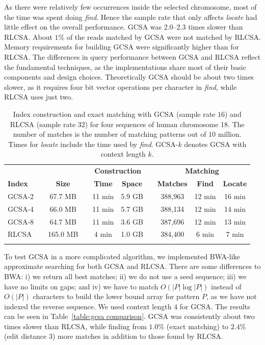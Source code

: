 As there were relatively few occurrences inside the selected chromosome, most of the time was spent doing \emph{find}. Hence the sample rate that only affects \emph{locate} had little effect on the overall performance. GCSA was 2.0\nobreakdash--2.3 times slower than RLCSA. About $1\%$ of the reads matched by GCSA were not matched by RLCSA. Memory requirements for building GCSA were significantly higher than for RLCSA. The differences in query performance between GCSA and RLCSA reflect the fundamental techniques, as the implementations share most of their basic components and design choices. Theoretically GCSA should be about two times slower, as it requires four bit vector operations per character in \emph{find}, while RLCSA uses just two.

\begin{table}
\centering
\renewcommand{\tabcolsep}{.1cm}
\begin{tabular}{lccccccccc}
\hline\noalign{\smallskip}
 & & & & \multicolumn{2}{c}{{\bf Construction}} & & \multicolumn{3}{c}{{\bf Matching}} \\
{\bf Index} & & {\bf Size} & & {\bf Time} & {\bf Space} & & {\bf Matches} & {\bf Find} & {\bf Locate} \\
\noalign{\smallskip}
\hline
\noalign{\smallskip}
GCSA-2 & &  67.7 MB & & 11 min & 5.9 GB & & 388,963 & 12 min & 16 min \\
GCSA-4 & &  66.0 MB & & 11 min & 5.7 GB & & 388,134 & 12 min & 14 min \\
GCSA-8 & &  64.7 MB & & 11 min & 3.6 GB & & 387,696 & 12 min & 13 min \\
RLCSA  & & 165.0 MB & &  4 min & 1.0 GB & & 384,400 &  6 min &  7 min \\
\noalign{\smallskip}
\hline
\end{tabular}

\caption{Index construction and exact matching with GCSA (sample rate $16$) and RLCSA (sample rate $32$) for four sequences of human chromosome 18. The number of matches is the number of matching patterns out of $10$ million. Times for \emph{locate} include the time used by \emph{find}. GCSA\nobreakdash-$k$ denotes GCSA with context length $k$.}
\label{table:gcsa construction}
\end{table}

To test GCSA in a more complicated algorithm, we implemented BWA-like approximate searching \cite{Li2009} for both GCSA and RLCSA. There are some differences to BWA: i) we return all best matches; ii) we do not use a seed sequence; iii) we have no limits on gaps; and iv) we have to match $O(|P| \log |P|)$ instead of $O(|P|)$ characters to build the lower bound array for pattern $P$, as we have not indexed the reverse sequence. We used context length $4$ for GCSA. The results can be seen in Table~\ref{table:gcsa comparison}. GCSA was consistently about two times slower than RLCSA, while finding from $1.0\%$ (exact matching) to $2.4\%$ (edit distance $3$) more matches in addition to those found by RLCSA.

